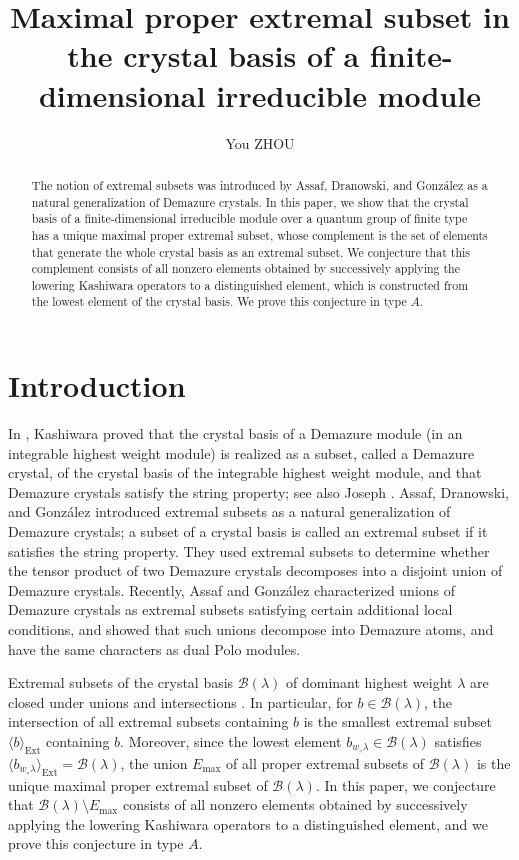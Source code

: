 \documentclass[reqno]{amsart}
\title[Maximal proper extremal subset of a crystal basis]
{Maximal proper extremal subset in the crystal basis of a finite-dimensional irreducible module}
\author{You ZHOU}
\date{}
\theoremstyle{definition}
\theoremstyle{remark}
\numberwithin{equation}{section}
\newcommand{\B}{\mathcal{B}}
\newcommand{\Ext}{\operatorname{Ext}}
\newcommand{\wo}{w_\circ}
\newcommand{\Bl}{\B(\lambda)}
\begin{document}
\begin{abstract}
    The notion of extremal subsets was introduced by Assaf, Dranowski, and Gonz\'alez as a natural generalization of Demazure crystals. 
    In this paper, we show that the crystal basis of a finite-dimensional irreducible module over a quantum group of finite type has a unique maximal proper extremal subset, whose complement is the set of elements that generate the whole crystal basis as an extremal subset.
	We conjecture that this complement consists of all nonzero elements obtained by successively applying the lowering Kashiwara operators to a distinguished element,
    which is constructed from the lowest element of the crystal basis.
	We prove this conjecture in type $A$.
\end{abstract}
	\maketitle
	
    
   \section{Introduction}


 In \cite{kashiwara1993}, Kashiwara proved that
the crystal basis of a Demazure module (in an integrable highest weight module)
is realized as a subset, called a Demazure crystal, of the crystal basis of
the integrable highest weight module,
and that Demazure crystals satisfy the string property;
see also Joseph \cite{joseph2003}.
Assaf, Dranowski, and Gonz\'alez \cite{assaf2023} introduced extremal subsets as a natural generalization of Demazure crystals;
a subset of a crystal basis is called an extremal subset if it satisfies the string property.
They used extremal subsets to determine whether the tensor product of two Demazure crystals decomposes
into a disjoint union of Demazure crystals.
Recently, Assaf and Gonz\'alez \cite{assafgonzalez2025} characterized unions of
Demazure crystals as extremal subsets satisfying
certain additional local conditions, and showed that such unions
decompose into Demazure atoms,
and have the same characters as dual Polo modules.

Extremal subsets of the crystal basis $\Bl$ of dominant highest weight $\lambda$ are closed under unions and intersections \cite{armon2023}.
In particular, for $b\in\Bl$, the intersection of all extremal subsets containing $b$ is the smallest extremal subset $\langle b\rangle_{\Ext}$ containing $b$.
Moreover, since the lowest element $b_{\wo\lambda}\in \Bl$ satisfies $\langle b_{\wo\lambda}\rangle_{\Ext}=\Bl$,
the union $E_{\max}$ of all proper extremal subsets of $\Bl$ is the unique maximal proper extremal subset of $\Bl$.
In this paper, we conjecture that $\Bl\setminus E_{\max}$ consists of all nonzero elements
obtained by successively applying the lowering Kashiwara operators to a distinguished element,
and we prove this conjecture in type $A$.
\end{document}
